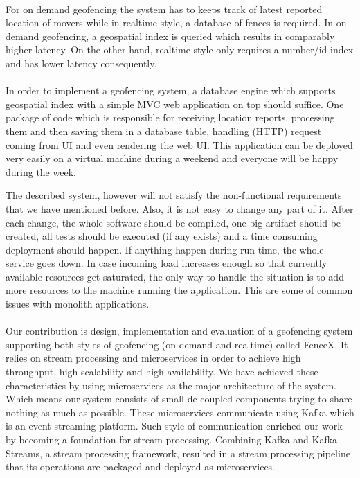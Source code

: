 \documentclass[a4]{report}
\begin{document}
    \paragraph{}
    For on demand geofencing the system has to keeps track of latest reported location of movers while in realtime
    style, a database of fences is required.
    In on demand geofencing, a geospatial index is queried which results in comparably higher latency.
    On the other hand, realtime style only requires a number/id index and has lower latency consequently.

    \paragraph{}
    In order to implement a geofencing system, a database engine which supports geospatial index with a simple MVC\cite{mvc}
    web application on top should suffice.
    One package of code which is responsible for receiving location reports, processing them and then saving them in
    a database table, handling (HTTP) request coming from UI and even rendering the web UI.
    This application can be deployed very easily on a virtual machine during a weekend and everyone will be happy
    during the week.

    The described system, however will not satisfy the non-functional requirements that we have mentioned before.
    Also, it is not easy to change any part of it.
    After each change, the whole software should be compiled, one big artifact should be created, all tests should be
    executed (if any exists) and a time consuming deployment should happen.
    If anything happen during run time, the whole service goes down.
    In case incoming load increases enough so that currently available resources get saturated, the only way to handle
    the situation is to add more resources to the machine running the application.
    This are some of common issues with monolith applications.

    \paragraph{}
    Our contribution is design, implementation and evaluation of a geofencing system supporting both styles of
    geofencing (on demand and realtime) called FenceX\cite{fencex}.
    It relies on stream processing\cite{making-sense-of-stream-processing} and microservices in order to achieve high
    throughput, high scalability and high availability.
    We have achieved these characteristics by using microservices as the major architecture of the system.
    Which means our system consists of small de-coupled components trying to share nothing as much as possible.
    These microservices communicate using Kafka\cite{kafka} which is an event streaming platform.
    Such style of communication enriched our work by becoming a foundation for stream processing.
    Combining Kafka and Kafka Streams\cite{kafkaStreams}, a stream processing framework, resulted in a
    stream processing pipeline that its operations are packaged and deployed as microservices.
\end{document}
